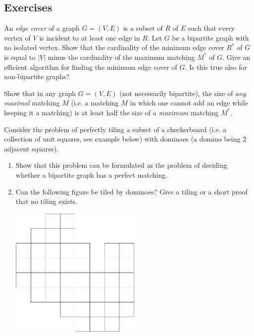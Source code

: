 \documentclass[12pt]{article}
\begin{document}
\subsection*{Exercises}
\begin{exercises}
\item 
An {\it edge cover} of a graph $G=(V,E)$ is a subset of $R$ of $E$ such that
every vertex of $V$ is incident to at least one edge in $R$.  Let $G$
be a bipartite graph with no isolated vertex.  Show that the
cardinality of the minimum edge cover $R^*$ of $G$ is equal to $|V|$
minus the cardinality of the maximum matching $M^*$ of $G$.  Give an
efficient algorithm for finding the minimum edge cover of $G$. Is this
true also for non-bipartite graphs? 

\item
Show that in any graph $G=(V,E)$ (not necessarily bipartite), the size
of {\it any maximal} matching $M$ (i.e. a matching $M$ in which one
cannot add an edge while keeping it a matching) is at least half the
size of a {\it maximum} matching $M^*$. 

\item Consider the problem of perfectly tiling a subset of a checkerboard
  (i.e. a collection of unit squares, see example below) with dominoes
  (a domino being 2 adjacent squares).
\begin{enumerate}
\item
Show that this problem can be formulated as the problem of deciding
whether a bipartite graph has a perfect matching. 
\item 
Can the following figure be tiled by dominoes? Give a tiling or
  a short proof that no tiling exists.

\begin{center}
\includegraphics[height=2.5in]{../figures/domino}
\end{center}
\end{enumerate}


\end{exercises}
\end{document}

